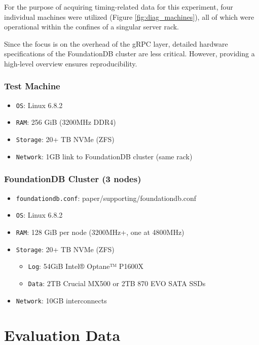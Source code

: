 \documentclass[sigconf]{acmart}
\begin{document}
For the purpose of acquiring timing-related data for this experiment, four individual machines were utilized (Figure \ref{fig:diag_machines}), all of which were operational within the confines of a singular server rack.

Since the focus is on the overhead of the gRPC layer, detailed hardware specifications of the FoundationDB cluster are less critical. However, providing a high-level overview ensures reproducibility.

\subsubsection{Test Machine}

\begin{itemize}
\item {\texttt{OS}}: Linux 6.8.2
\item{\texttt{RAM}}: 256 GiB (3200MHz DDR4)
\item{\texttt{Storage}}: 20+ TB NVMe (ZFS)
\item{\texttt{Network}}: 1GB link to FoundationDB cluster (same rack)
\end{itemize}

\subsubsection{FoundationDB Cluster (3 nodes)}

\begin{itemize}
    \item {\texttt{foundationdb.conf}}: paper/supporting/foundationdb.conf
    \item {\texttt{OS}}: Linux 6.8.2
    \item{\texttt{RAM}}: 128 GiB per node (3200MHz+, one at 4800MHz)
    \item{\texttt{Storage}}: 20+ TB NVMe (ZFS)
    \begin{itemize}
        \item{\texttt{Log}}: 54GiB Intel® Optane™ P1600X
        \item{\texttt{Data}}: 2TB Crucial MX500 or 2TB 870 EVO SATA SSDs
    \end{itemize}
    \item{\texttt{Network}}: 10GB interconnects
\end{itemize}

\section{Evaluation Data}
\end{document}
